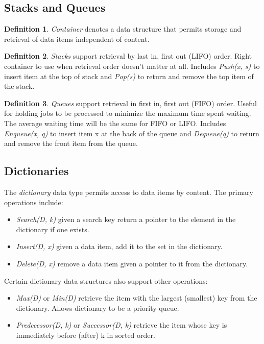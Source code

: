 \documentclass[10pt]{article}
\theoremstyle{definition}
\newtheorem*{definition}{Definition}
\begin{document}
\subsection{Stacks and Queues}
\begin{definition}
    \textit{Container} denotes a data structure that permits storage and retrieval of data items independent of content.
\end{definition}
\begin{definition}
    \textit{Stacks} support retrieval by last in, first out (LIFO) order. Right container to use when retrieval order doesn't matter at all. Includes \textit{Push(x, s)} to insert item at the top of stack and \textit{Pop(s)} to return and remove the top item of the stack.
\end{definition}
\begin{definition}
    \textit{Queues} support retrieval in first in, first out (FIFO) order. Useful for holding jobs to be processed to minimize the maximum time spent waiting. The average waiting time will be the same for FIFO or LIFO. Includes \textit{Enqueue(x, q)} to insert item x at the back of the queue and \textit{Dequeue(q)} to return and remove the front item from the queue.
\end{definition}

\subsection{Dictionaries}
The \textit{dictionary} data type permits access to data items by content. The primary operations include:
\begin{itemize}
    \item \textit{Search(D, k)} given a search key return a pointer to the element in the dictionary if one exists.
    \item \textit{Insert(D, x)} given a data item, add it to the set in the dictionary.
    \item \textit{Delete(D, x)} remove a data item given a pointer to it from the dictionary.
\end{itemize}
Certain dictionary data structures also support other operations:
\begin{itemize}
    \item \textit{Max(D)} or \textit{Min(D)} retrieve the item with the largest (smallest) key from the dictionary. Allows dictionary to be a priority queue.
    \item \textit{Predecessor(D, k)} or \textit{Successor(D, k)} retrieve the item whose key is immediately before (after) k in sorted order.
\end{itemize}
\end{document}
